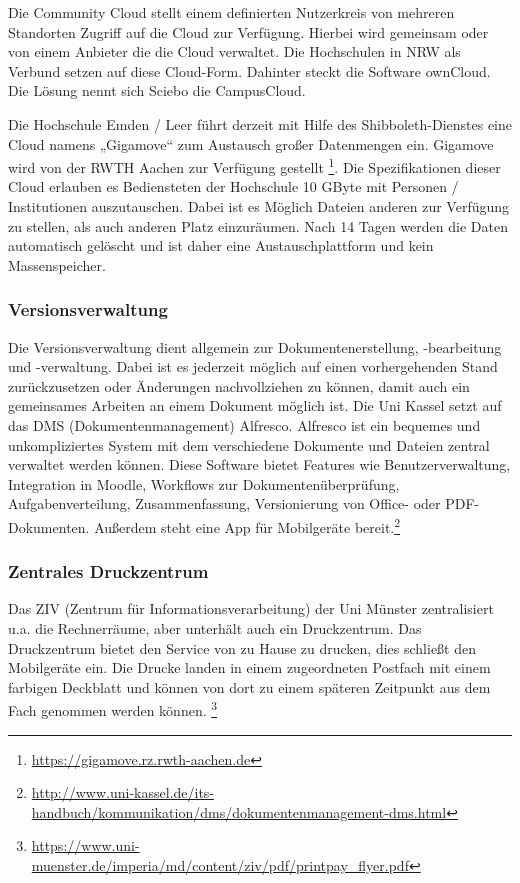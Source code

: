 Die Community Cloud stellt einem definierten Nutzerkreis von mehreren Standorten Zugriff auf die Cloud zur Verfügung. Hierbei wird gemeinsam oder von einem Anbieter die die Cloud verwaltet. Die Hochschulen in NRW als Verbund setzen auf diese Cloud-Form. Dahinter steckt die Software ownCloud. Die Lösung nennt sich Sciebo die CampusCloud.

Die Hochschule Emden / Leer führt derzeit mit Hilfe des Shibboleth-Dienstes eine Cloud namens „Gigamove“ zum Austausch großer Datenmengen ein. Gigamove wird von der RWTH Aachen zur Verfügung gestellt \footnote{\url{https://gigamove.rz.rwth-aachen.de}}. Die Spezifikationen dieser Cloud erlauben es Bediensteten der Hochschule 10 GByte mit Personen / Institutionen auszutauschen. Dabei ist es Möglich Dateien anderen zur Verfügung zu stellen, als auch anderen Platz einzuräumen. Nach 14 Tagen werden die Daten automatisch gelöscht und ist daher eine Austauschplattform und kein Massenspeicher.

\subsubsection{Versionsverwaltung}
Die Versionsverwaltung dient allgemein zur Dokumentenerstellung, -bearbeitung und -verwaltung. Dabei ist es jederzeit möglich auf einen vorhergehenden Stand zurückzusetzen oder Änderungen nachvollziehen zu können, damit auch ein gemeinsames Arbeiten an einem Dokument möglich ist. Die Uni Kassel setzt auf das DMS (Dokumentenmanagement) Alfresco. Alfresco ist ein bequemes und unkompliziertes System mit dem verschiedene Dokumente und Dateien zentral verwaltet werden können. Diese Software bietet Features wie Benutzerverwaltung, Integration in Moodle, Workflows zur Dokumentenüberprüfung, Aufgabenverteilung, Zusammenfassung, Versionierung von Office- oder PDF-Dokumenten. Außerdem steht eine App für Mobilgeräte bereit.\footnote{\url{http://www.uni-kassel.de/its-handbuch/kommunikation/dms/dokumentenmanagement-dms.html}}


\subsubsection{Zentrales Druckzentrum}
Das ZIV (Zentrum für Informationsverarbeitung) der Uni Münster zentralisiert u.a. die Rechnerräume, aber unterhält auch ein Druckzentrum. Das Druckzentrum bietet den Service von zu Hause zu drucken, dies schließt den Mobilgeräte ein. Die Drucke landen in einem zugeordneten Postfach mit einem farbigen Deckblatt und können von dort zu einem späteren Zeitpunkt aus dem Fach genommen werden können.
\footnote{\url{https://www.uni-muenster.de/imperia/md/content/ziv/pdf/printpay_flyer.pdf}}

